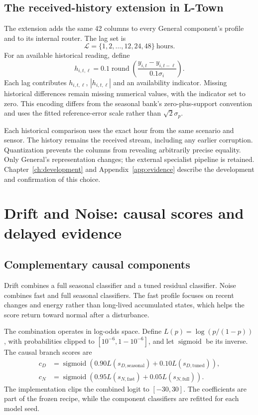 \subsection{The received-history extension in L-Town}
The extension adds the same 42 columns to every General component's profile and to its internal router. The lag set is
\begin{equation}
 \mathcal L=\{1,2,\ldots,12,24,48\}\ \mathrm{hours}.
\end{equation}
For an available historical reading, define
\begin{equation}
 h_{i,t,\ell}=0.1\operatorname{round}
 \left(\frac{y_{i,t}-y_{i,t-\ell}}{0.1\sigma_i}\right).
 \label{eq:receivedhistory}
\end{equation}
Each lag contributes $h_{i,t,\ell}$, $|h_{i,t,\ell}|$ and an availability indicator. Missing historical differences remain missing numerical values, with the indicator set to zero. This encoding differs from the seasonal bank's zero-plus-support convention and uses the fitted reference-error scale rather than $\sqrt{2}\sigma_p$.

Each historical comparison uses the exact hour from the same scenario and sensor. The history remains the received stream, including any earlier corruption. Quantization prevents the columns from revealing arbitrarily precise equality. Only General's representation changes; the external specialist pipeline is retained. Chapter~\ref{ch:development} and Appendix~\ref{app:evidence} describe the development and confirmation of this choice.

\section{Drift and Noise: causal scores and delayed evidence}
\subsection{Complementary causal components}
Drift combines a full seasonal classifier and a tuned residual classifier. Noise combines fast and full seasonal classifiers. The fast profile focuses on recent changes and energy rather than long-lived accumulated states, which helps the score return toward normal after a disturbance.

The combination operates in log-odds space. Define $L(p)=\log(p/(1-p))$, with probabilities clipped to $[10^{-6},1-10^{-6}]$, and let $\operatorname{sigmoid}$ be its inverse. The causal branch scores are
\begin{align}
 c_D&=\operatorname{sigmoid}\left(0.90L(s_{D,\mathrm{seasonal}})
                                  +0.10L(s_{D,\mathrm{tuned}})\right),\\
 c_N&=\operatorname{sigmoid}\left(0.95L(s_{N,\mathrm{fast}})
                                  +0.05L(s_{N,\mathrm{full}})\right).
\end{align}
The implementation clips the combined logit to $[-30,30]$. The coefficients are part of the frozen recipe, while the component classifiers are refitted for each model seed.

